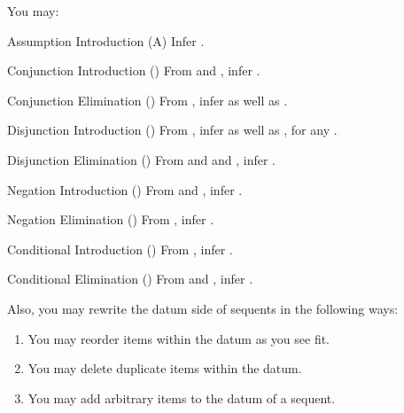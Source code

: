 You may:

\begin{infrule}

 \item[Assumption Introduction (A)] Infer   .

 \item[Conjunction Introduction (\conjI)] From  and 
  , infer .


 \item[Conjunction Elimination (\conjE)] From , 
  infer  as well as .

 \item[Disjunction Introduction (\disjI)] From , infer 
   as well as , for 
  any .

 \item[Disjunction Elimination (\disjE)] From  and
   and , infer 
  .

 \item[Negation Introduction (\negI)] From  and , infer .

 \item[Negation Elimination (\negE)] From , infer 
  .

 \item[Conditional Introduction (\condI)] From , infer .
 
 \item[Conditional Elimination (\condE)] From  and , infer .

\end{infrule}


Also, you may rewrite the datum side of sequents in the following ways:

\begin{enumerate}
 \renewcommand{\labelenumi}{\alph{enumi}.}
 
 \item You may reorder items within the datum as you see fit.

 \item You may delete duplicate items within the datum.

 \item You may add arbitrary items to the datum of a sequent.

\end{enumerate}


